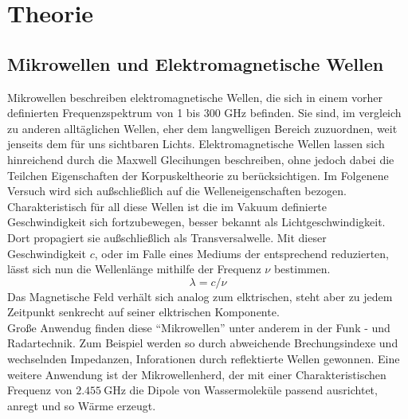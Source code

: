 \section{Theorie}

\subsection{Mikrowellen und Elektromagnetische Wellen }
Mikrowellen beschreiben elektromagnetische Wellen, die sich in einem vorher definierten Frequenzspektrum von 1 bis 300 $\si{\giga\hertz}$ befinden. 
Sie sind, im vergleich zu anderen alltäglichen Wellen, eher dem langwelligen Bereich zuzuordnen, weit jenseits dem für uns sichtbaren Lichts.
Elektromagnetische Wellen lassen sich hinreichend durch die Maxwell Glecihungen beschreiben, ohne jedoch dabei die Teilchen Eigenschaften der Korpuskeltheorie zu berücksichtigen. Im Folgenene Versuch wird sich außschließlich auf die Welleneigenschaften bezogen.
Charakteristisch für all diese Wellen ist die im Vakuum definierte Geschwindigkeit sich fortzubewegen, besser bekannt als Lichtgeschwindigkeit. Dort propagiert sie außschließlich als Transversalwelle.
Mit dieser Geschwindigkeit $c$, oder im Falle eines Mediums der entsprechend reduzierten, lässt sich nun die Wellenlänge mithilfe der Frequenz $\nu$ bestimmen.
\begin{equation}
    \label{eqn:1}
\lambda = c/{\nu}
\end{equation}
Das Magnetische Feld verhält sich analog zum elktrischen, steht aber zu jedem Zeitpunkt senkrecht auf seiner elktrischen Komponente. \\  Große Anwendug 
finden diese \enquote{Mikrowellen} unter anderem in der Funk - und Radartechnik. Zum Beispiel werden so durch abweichende Brechungsindexe und wechselnden Impedanzen,  Inforationen durch reflektierte Wellen gewonnen. 
Eine weitere Anwendung ist der Mikrowellenherd, der mit einer Charakteristischen Frequenz von $\SI{2.455}{\giga\hertz}$ die Dipole von Wassermoleküle passend ausrichtet, anregt und so Wärme erzeugt.

